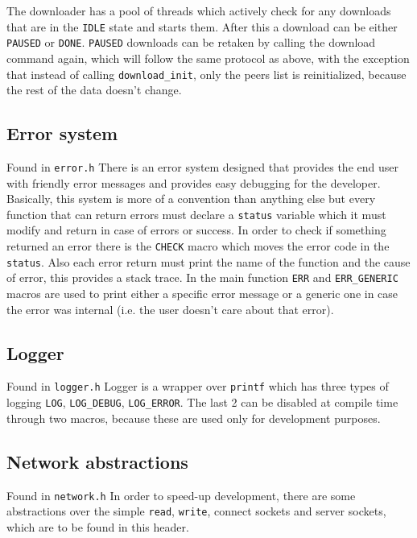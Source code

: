 \documentclass[runningheads]{llncs}
\begin{document}
The downloader has a pool of threads which actively check for any downloads that are in the \verb|IDLE| state and starts them. After this a download can be either \verb|PAUSED| or \verb|DONE|. \verb|PAUSED| downloads can be retaken by calling the download command again, which will follow the same protocol as above, with the exception that instead of calling \verb|download_init|, only the peers list is reinitialized, because the rest of the data doesn't change.

\subsection{Error system}
Found in \verb|error.h|
There is an error system designed that provides the end user with friendly error messages and provides easy debugging for the developer. Basically, this system is more of a convention than anything else but every function that can return errors must declare a \verb|status| variable which it must modify and return in case of errors or success. In order to check if something returned an error there is the \verb|CHECK| macro which moves the error code in the \verb|status|. Also each error return must print the name of the function and the cause of error, this provides a stack trace. In the main function \verb|ERR| and \verb|ERR_GENERIC| macros are used to print either a specific error message or a generic one in case the error was internal (i.e. the user doesn't care about that error).

\subsection{Logger}
Found in \verb|logger.h|
Logger is a wrapper over \verb|printf| which has three types of logging \verb|LOG|, \verb|LOG_DEBUG|, \verb|LOG_ERROR|. The last 2 can be disabled at compile time through two macros, because these are used only for development purposes.

\subsection{Network abstractions}
Found in \verb|network.h|
In order to speed-up development, there are some abstractions over the simple \verb|read|, \verb|write|, connect sockets and server sockets, which are to be found in this header. 
\end{document}
